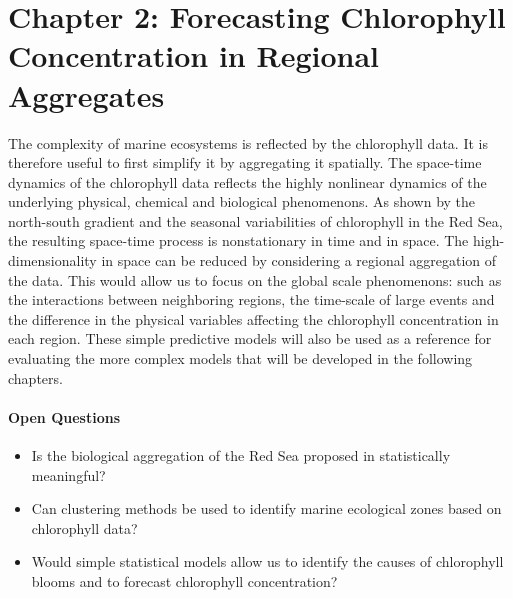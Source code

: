 \section{Chapter 2: Forecasting Chlorophyll Concentration in Regional
Aggregates}

The complexity of marine ecosystems is reflected by the chlorophyll data.  It
is therefore useful to first simplify it by aggregating it spatially. The
space-time dynamics of the chlorophyll data reflects the highly nonlinear
dynamics of the underlying physical, chemical and biological phenomenons. As
shown by the north-south gradient and the seasonal variabilities of chlorophyll
in the Red Sea, the resulting
space-time process is nonstationary in time and in space. The
high-dimensionality in space can be reduced by considering a regional
aggregation of the data. This would allow us to focus on the global scale
phenomenons: such as the interactions between neighboring regions, the
time-scale of large events and the difference in the physical variables
affecting the chlorophyll concentration in each region.  These simple
predictive models will also be used as a reference for evaluating the more
complex models that will be developed in the following chapters.

\paragraph{Open Questions}

\begin{itemize}

\item Is the biological aggregation of the Red Sea proposed in
\citep{Raitsos2013} statistically meaningful?

\item Can clustering methods be used to identify marine ecological zones based
on chlorophyll data?

\item Would simple statistical models allow us to identify the causes of
chlorophyll blooms and to forecast chlorophyll concentration?

\end{itemize}

